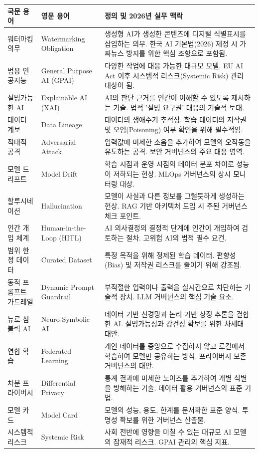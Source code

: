\begin{table}[htbp]
\centering
\begin{tabularx}{\textwidth}{p{3.5cm}p{4cm}X}
\toprule
\textbf{국문 용어} & \textbf{영문 용어} & \textbf{정의 및 2026년 실무 맥락} \\
\midrule
워터마킹 의무 & Watermarking Obligation & 생성형 AI가 생성한 콘텐츠에 디지털 식별표시를 삽입하는 의무. 한국 AI 기본법(2026) 제정 시 가짜뉴스 방지를 위한 핵심 조항으로 포함됨. \\
\midrule
범용 인공지능 & General Purpose AI (GPAI) & 다양한 작업에 대응 가능한 대규모 모델. EU AI Act 이후 시스템적 리스크(Systemic Risk) 관리 대상이 됨. \\
\midrule
설명가능한 AI & Explainable AI (XAI) & AI의 판단 근거를 인간이 이해할 수 있도록 제시하는 기술. 법적 '설명 요구권' 대응의 기술적 토대. \\
\midrule
데이터 계보 & Data Lineage & 데이터의 생애주기 추적성. 학습 데이터의 저작권 및 오염(Poisoning) 여부 확인을 위해 필수적임. \\
\midrule
적대적 공격 & Adversarial Attack & 입력값에 미세한 소음을 추가하여 모델의 오작동을 유도하는 공격. 보안 거버넌스의 주요 대응 영역. \\
\midrule
모델 드리프트 & Model Drift & 학습 시점과 운영 시점의 데이터 분포 차이로 성능이 저하되는 현상. MLOps 거버넌스의 상시 모니터링 대상. \\
\midrule
할루시네이션 & Hallucination & 모델이 사실과 다른 정보를 그럴듯하게 생성하는 현상. RAG 기반 아키텍처 도입 시 주된 거버넌스 체크 포인트. \\
\midrule
인간 개입 체계 & Human-in-the-Loop (HITL) & AI 의사결정의 결정적 단계에 인간이 개입하여 검토하는 절차. 고위험 AI의 법적 필수 요건. \\
\midrule
범위 한정 데이터 & Curated Dataset & 특정 목적을 위해 정제된 학습 데이터. 편향성(Bias) 및 저작권 리스크를 줄이기 위해 강조됨. \\
\midrule
동적 프롬프트 가드레일 & Dynamic Prompt Guardrail & 부적절한 입력이나 출력을 실시간으로 차단하는 기술적 장치. LLM 거버넌스의 핵심 기술 요소. \\
\midrule
뉴로-심볼릭 AI & Neuro-Symbolic AI & 데이터 기반 신경망과 논리 기반 상징 추론을 결합한 AI. 설명가능성과 강건성 확보를 위한 차세대 대안. \\
\midrule
연합 학습 & Federated Learning & 개인 데이터를 중앙으로 수집하지 않고 로컬에서 학습하여 모델만 공유하는 방식. 프라이버시 보존 거버넌스의 대안. \\
\midrule
차분 프라이버시 & Differential Privacy & 통계 결과에 미세한 노이즈를 추가하여 개별 식별을 방해하는 기술. 데이터 활용 거버넌스의 표준 기법. \\
\midrule
모델 카드 & Model Card & 모델의 성능, 용도, 한계를 문서화한 표준 양식. 투명성 확보를 위한 거버넌스 산출물. \\
\midrule
시스템적 리스크 & Systemic Risk & 사회 전반에 영향을 미칠 수 있는 대규모 AI 모델의 잠재적 리스크. GPAI 관리의 핵심 지표. \\
\bottomrule
\end{tabularx}
\end{table}


